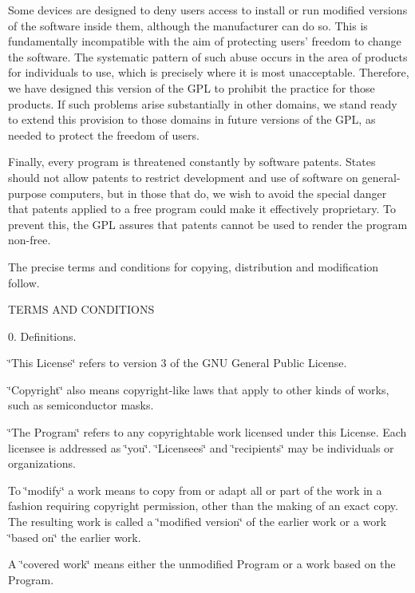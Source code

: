 Some devices are designed to deny users access to install or run modified versions of the software inside them, although the manufacturer can do so. This is fundamentally incompatible with the aim of protecting users' freedom to change the software. The systematic pattern of such abuse occurs in the area of products for individuals to use, which is precisely where it is most unacceptable. Therefore, we have designed this version of the G\+P\+L to prohibit the practice for those products. If such problems arise substantially in other domains, we stand ready to extend this provision to those domains in future versions of the G\+P\+L, as needed to protect the freedom of users.

Finally, every program is threatened constantly by software patents. States should not allow patents to restrict development and use of software on general-\/purpose computers, but in those that do, we wish to avoid the special danger that patents applied to a free program could make it effectively proprietary. To prevent this, the G\+P\+L assures that patents cannot be used to render the program non-\/free.

The precise terms and conditions for copying, distribution and modification follow. \begin{DoxyVerb}                   TERMS AND CONDITIONS
\end{DoxyVerb}


0. Definitions.

\char`\"{}\+This License\char`\"{} refers to version 3 of the G\+N\+U General Public License.

\char`\"{}\+Copyright\char`\"{} also means copyright-\/like laws that apply to other kinds of works, such as semiconductor masks.

\char`\"{}\+The Program\char`\"{} refers to any copyrightable work licensed under this License. Each licensee is addressed as \char`\"{}you\char`\"{}. \char`\"{}\+Licensees\char`\"{} and \char`\"{}recipients\char`\"{} may be individuals or organizations.

To \char`\"{}modify\char`\"{} a work means to copy from or adapt all or part of the work in a fashion requiring copyright permission, other than the making of an exact copy. The resulting work is called a \char`\"{}modified version\char`\"{} of the earlier work or a work \char`\"{}based on\char`\"{} the earlier work.

A \char`\"{}covered work\char`\"{} means either the unmodified Program or a work based on the Program.

